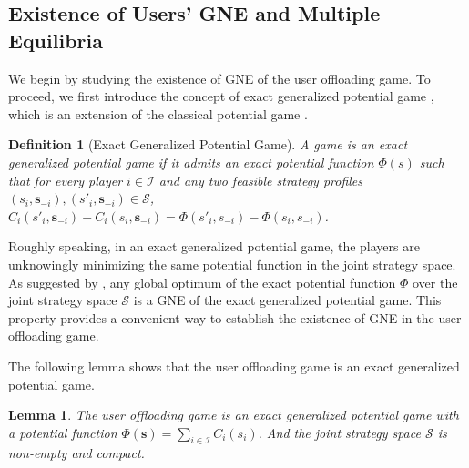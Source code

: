 \documentclass[lettersize,journal]{IEEEtran}
\newtheorem{definition}{Definition}
\newtheorem{lemma}{Lemma}
\begin{document}
\subsection{Existence of Users' GNE and Multiple Equilibria}\label{Subsection:NE-existence}
We begin by studying the existence of GNE of the user offloading game. To proceed, we first introduce the concept of exact generalized potential game \cite{sagratella2017algorithms,facchinei2011decomposition}, which is an extension of the classical potential game \cite{MONDERER1996124}.

\begin{definition}[Exact Generalized Potential Game]
    A game is an exact generalized potential game if it admits an exact potential function $\Phi(s)$ such that for every player $i\in\mathcal{I}$ and any two feasible strategy profiles $(s_i,\boldsymbol{s}_{-i}),(s'_i,\boldsymbol{s}_{-i})\in \mathcal{S}$, $C_i(s'_i,\boldsymbol{s}_{-i})-C_i(s_i,\boldsymbol{s}_{-i})=\Phi(s'_i,s_{-i})-\Phi(s_i,s_{-i})$.
\end{definition}

Roughly speaking, in an exact generalized potential game, the players are unknowingly minimizing the same potential function in the joint strategy space. As suggested by \cite{facchinei2011decomposition,sagratella2017algorithms}, any global optimum of the exact potential function $\Phi$ over the joint strategy space $\mathcal{S}$ is a GNE of the exact generalized potential game. This property provides a convenient way to establish the existence of GNE in the user offloading game.

The following lemma shows that the user offloading game is an exact generalized potential game.
\begin{lemma}\label{lemma:egpg}
    The user offloading game is an exact generalized potential game with a potential function \( \Phi(\boldsymbol{s}) = \sum_{i \in \mathcal{I}} C_i(s_i) \). And the joint strategy space $\mathcal{S}$ is non-empty and compact.
\end{lemma}
\end{document}
